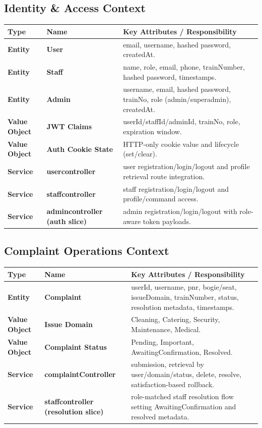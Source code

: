 \documentclass[12pt,a4paper]{report}
\renewcommand{\toprule}{\hline\hline}
\renewcommand{\midrule}{\hline}
\renewcommand{\bottomrule}{\hline\hline}
\begin{document}
\subsection{Identity \& Access Context}
\begin{table}[H]
\centering
\begin{tabularx}{\textwidth}{>{\bfseries}p{} >{\bfseries}p{} Y}
\toprule
{}
\textcolor{TableHeaderText}{Type} & \textcolor{TableHeaderText}{Name} & \textcolor{TableHeaderText}{Key Attributes / Responsibility} \\
\midrule
Entity & User & email, username, hashed password, createdAt. \\
Entity & Staff & name, role, email, phone, trainNumber, hashed password, timestamps. \\
Entity & Admin & username, email, hashed password, trainNo, role (admin/superadmin), createdAt. \\
Value Object & JWT Claims & userId/staffId/adminId, trainNo, role, expiration window. \\
Value Object & Auth Cookie State & HTTP-only cookie value and lifecycle (set/clear). \\
Service & usercontroller & user registration/login/logout and profile retrieval route integration. \\
Service & staffcontroller & staff registration/login/logout and profile/command access. \\
Service & admincontroller (auth slice) & admin registration/login/logout with role-aware token payloads. \\
\bottomrule
\end{tabularx}
\end{table}

\subsection{Complaint Operations Context}
\begin{table}[H]
\centering
\begin{tabularx}{\textwidth}{>{\bfseries}p{} >{\bfseries}p{} Y}
\toprule
{}
\textcolor{TableHeaderText}{Type} & \textcolor{TableHeaderText}{Name} & \textcolor{TableHeaderText}{Key Attributes / Responsibility} \\
\midrule
Entity & Complaint & userId, username, pnr, bogie/seat, issueDomain, trainNumber, status, resolution metadata, timestamps. \\
Value Object & Issue Domain & Cleaning, Catering, Security, Maintenance, Medical. \\
Value Object & Complaint Status & Pending, Important, AwaitingConfirmation, Resolved. \\
Service & complaintController & submission, retrieval by user/domain/status, delete, resolve, satisfaction-based rollback. \\
Service & staffcontroller (resolution slice) & role-matched staff resolution flow setting AwaitingConfirmation and resolved metadata. \\
\bottomrule
\end{tabularx}
\end{table}
\end{document}
